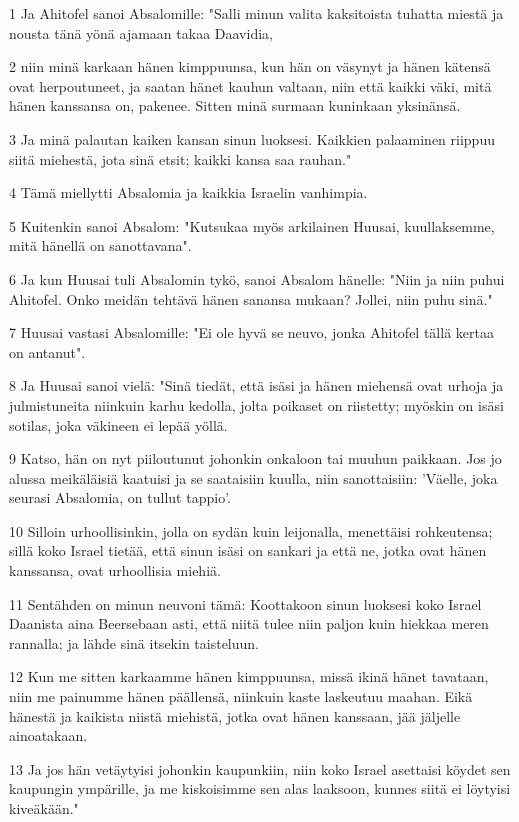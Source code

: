 \par 1 Ja Ahitofel sanoi Absalomille: "Salli minun valita kaksitoista tuhatta miestä ja nousta tänä yönä ajamaan takaa Daavidia,
\par 2 niin minä karkaan hänen kimppuunsa, kun hän on väsynyt ja hänen kätensä ovat herpoutuneet, ja saatan hänet kauhun valtaan, niin että kaikki väki, mitä hänen kanssansa on, pakenee. Sitten minä surmaan kuninkaan yksinänsä.
\par 3 Ja minä palautan kaiken kansan sinun luoksesi. Kaikkien palaaminen riippuu siitä miehestä, jota sinä etsit; kaikki kansa saa rauhan."
\par 4 Tämä miellytti Absalomia ja kaikkia Israelin vanhimpia.
\par 5 Kuitenkin sanoi Absalom: "Kutsukaa myös arkilainen Huusai, kuullaksemme, mitä hänellä on sanottavana".
\par 6 Ja kun Huusai tuli Absalomin tykö, sanoi Absalom hänelle: "Niin ja niin puhui Ahitofel. Onko meidän tehtävä hänen sanansa mukaan? Jollei, niin puhu sinä."
\par 7 Huusai vastasi Absalomille: "Ei ole hyvä se neuvo, jonka Ahitofel tällä kertaa on antanut".
\par 8 Ja Huusai sanoi vielä: "Sinä tiedät, että isäsi ja hänen miehensä ovat urhoja ja julmistuneita niinkuin karhu kedolla, jolta poikaset on riistetty; myöskin on isäsi sotilas, joka väkineen ei lepää yöllä.
\par 9 Katso, hän on nyt piiloutunut johonkin onkaloon tai muuhun paikkaan. Jos jo alussa meikäläisiä kaatuisi ja se saataisiin kuulla, niin sanottaisiin: 'Väelle, joka seurasi Absalomia, on tullut tappio'.
\par 10 Silloin urhoollisinkin, jolla on sydän kuin leijonalla, menettäisi rohkeutensa; sillä koko Israel tietää, että sinun isäsi on sankari ja että ne, jotka ovat hänen kanssansa, ovat urhoollisia miehiä.
\par 11 Sentähden on minun neuvoni tämä: Koottakoon sinun luoksesi koko Israel Daanista aina Beersebaan asti, että niitä tulee niin paljon kuin hiekkaa meren rannalla; ja lähde sinä itsekin taisteluun.
\par 12 Kun me sitten karkaamme hänen kimppuunsa, missä ikinä hänet tavataan, niin me painumme hänen päällensä, niinkuin kaste laskeutuu maahan. Eikä hänestä ja kaikista niistä miehistä, jotka ovat hänen kanssaan, jää jäljelle ainoatakaan.
\par 13 Ja jos hän vetäytyisi johonkin kaupunkiin, niin koko Israel asettaisi köydet sen kaupungin ympärille, ja me kiskoisimme sen alas laaksoon, kunnes siitä ei löytyisi kiveäkään."
